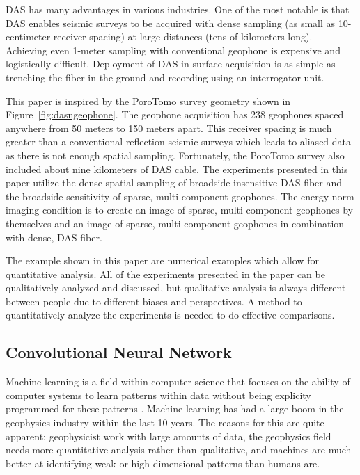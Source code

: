 DAS has many advantages in various industries. One of the most notable is that DAS enables seismic surveys to be acquired with dense sampling (as small as 10-centimeter receiver spacing) at large distances (tens of kilometers long). Achieving even 1-meter sampling with conventional geophone is expensive and logistically difficult. Deployment of DAS in surface acquisition is as simple as trenching the fiber in the ground and recording using an interrogator unit.

This paper is inspired by the PoroTomo survey geometry shown in Figure~\ref{fig:dasngeophone}. The geophone acquisition has 238 geophones spaced anywhere from 50 meters to 150 meters apart. This receiver spacing is much greater than a conventional reflection seismic surveys which leads to aliased data as there is not enough spatial sampling. Fortunately, the PoroTomo survey also included about nine kilometers of DAS cable. The experiments presented in this paper utilize the dense spatial sampling of broadside insensitive DAS fiber and the broadside sensitivity of sparse, multi-component geophones. The energy norm imaging condition is to create an image of sparse, multi-component geophones by themselves and an image of sparse, multi-component geophones in combination with dense, DAS fiber.   


The example shown in this paper are numerical examples which allow for quantitative analysis. All of the experiments presented in the paper can be qualitatively analyzed and discussed, but qualitative analysis is always different between people due to different biases and perspectives. A method to quantitatively analyze the experiments is needed to do effective comparisons.


\subsection{Convolutional Neural Network}
Machine learning is a field within computer science that focuses on the ability of computer systems to learn patterns within data without being explicity programmed for these patterns \citep{samuel1959some}. Machine learning has had a large boom in the geophysics industry within the last 10 years. The reasons for this are quite apparent: geophysicist work with large amounts of data, the geophysics field needs more quantitative analysis rather than qualitative, and machines are much better at identifying weak or high-dimensional patterns than humans are.

